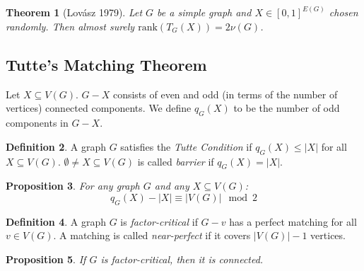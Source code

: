 \documentclass[11pt, a4paper]{article}
\newcommand{\abs}[1]{\left\lvert#1\right\rvert}
\newtheorem{theorem}{Theorem}[section]
\newtheorem{prop}[theorem]{Proposition}
\theoremstyle{remark}
\theoremstyle{definition}
\newtheorem{definition}[theorem]{Definition}
\begin{document}
\begin{theorem}[Lovász 1979]
	Let $G$ be a simple graph and $X\in [0,1]^{E(G)}$ chosen randomly.
	Then almost surely $\mathrm{rank}(T_G(X))=2\nu(G)$.
\end{theorem}


\subsection{Tutte's Matching Theorem}
Let $X\subseteq V(G)$. $G-X$ consists of even and odd (in terms of the
number of vertices) connected components. We define $q_G(X)$ to be the
number of odd components in $G-X$.

\begin{definition}
	A graph $G$ satisfies the \emph{Tutte Condition} if $q_G(X)\leq\abs{X}$
	for all $X\subseteq V(G)$. $\emptyset\neq X\subseteq V(G)$ is called
	\emph{barrier} if $q_G(X)=\abs{X}$.
\end{definition}

\begin{prop}\label{prop:tutte-even}
	For any graph $G$ and any $X\subseteq V(G)$:
	\[q_G(X)-\abs{X} \equiv \abs{V(G)}\mod 2\]
\end{prop}

\begin{definition}
	A graph $G$ is \emph{factor-critical} if $G-v$ has a perfect matching
	for all $v\in V(G)$. A matching is called \emph{near-perfect} if it
	covers $\abs{V(G)}-1$ vertices.
\end{definition}

\begin{prop}\label{prop:factor-critical-conn}
	 If $G$ is factor-critical, then it is connected.
\end{prop}
\end{document}
